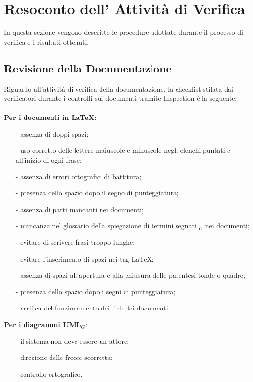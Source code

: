 \section{Resoconto dell' Attività di Verifica}
In questa sezione vengono descritte le procedure adottate durante il processo di
verifica e i risultati ottenuti.
\subsection{Revisione della Documentazione}
Riguardo all'attività di verifica della documentazione, la checklist stilata dai verificatori durante i controlli sui documenti tramite Inspection è la seguente:\\ \\
\textbf{Per i documenti in \LaTeX}:
\begin{itemize}
	\item[-] assenza di doppi spazi;
	\item[-] uso corretto delle lettere maiuscole e minuscole negli elenchi puntati e all'inizio di ogni frase;
	\item[-] assenza di errori ortografici di battitura;
	\item[-] presenza dello spazio dopo il segno di punteggiatura; 
	\item[-] assenza di parti mancanti nei documenti;
	\item[-] mancanza nel glossario della spiegazione di termini segnati $_G$ nei documenti;
	\item[-] evitare di scrivere frasi troppo lunghe;
	\item[-] evitare l'inserimento di spazi nei tag \LaTeX{};
	\item[-] assenza di spazi all'apertura e alla chiusura delle parentesi tonde o quadre;
	\item[-] presenza dello spazio dopo i segni di punteggiatura; 
	\item[-] verifica del funzionamento dei link dei documenti.
\end{itemize}
\textbf{Per i diagrammi UML$_G$}:
\begin{itemize}
	\item[-] il sistema non deve essere un attore;
	\item[-] direzione delle frecce scorretta;
	\item[-] controllo ortografico.
\end{itemize}
